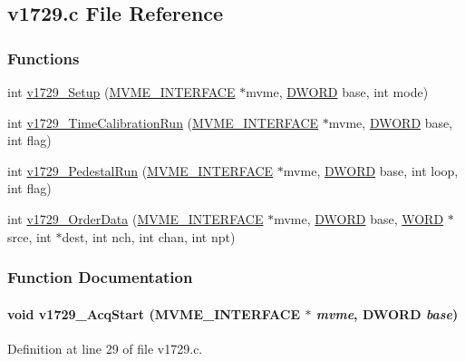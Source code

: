 \subsection{v1729.c File Reference}
\label{v1729_8c}
\subsubsection*{Functions}
\begin{DoxyCompactItemize}
\item 
int \hyperlink{v1729_8c_a16a8a323c157ed043a86ac69a6ada37d}{v1729\_\-Setup} (\hyperlink{structMVME__INTERFACE}{MVME\_\-INTERFACE} $\ast$mvme, \hyperlink{vt2_8h_a798af1e30bc65f319c1a246cecf59e39}{DWORD} base, int mode)
\item 
int \hyperlink{v1729_8c_a6a5b223f30c983b7f4dcac408d3f8b9f}{v1729\_\-TimeCalibrationRun} (\hyperlink{structMVME__INTERFACE}{MVME\_\-INTERFACE} $\ast$mvme, \hyperlink{vt2_8h_a798af1e30bc65f319c1a246cecf59e39}{DWORD} base, int flag)
\item 
int \hyperlink{v1729_8c_a135c3c66398c94b6bee6cccad799cfec}{v1729\_\-PedestalRun} (\hyperlink{structMVME__INTERFACE}{MVME\_\-INTERFACE} $\ast$mvme, \hyperlink{vt2_8h_a798af1e30bc65f319c1a246cecf59e39}{DWORD} base, int loop, int flag)
\item 
int \hyperlink{v1729_8c_a16527915223d5ba500133a7773990d57}{v1729\_\-OrderData} (\hyperlink{structMVME__INTERFACE}{MVME\_\-INTERFACE} $\ast$mvme, \hyperlink{vt2_8h_a798af1e30bc65f319c1a246cecf59e39}{DWORD} base, \hyperlink{vt2_8h_a2b0e863dadf920709ec53d9088ee7c91}{WORD} $\ast$srce, int $\ast$dest, int nch, int chan, int npt)
\end{DoxyCompactItemize}


\subsubsection{Function Documentation}
\paragraph[{v1729\_\-AcqStart}]{\setlength{\rightskip}{0pt plus 5cm}void v1729\_\-AcqStart ({\bf MVME\_\-INTERFACE} $\ast$ {\em mvme}, \/  {\bf DWORD} {\em base})}\hfill\label{v1729_8c_ada0344e2f7a00d26cc500f480fb47e4c}


Definition at line 29 of file v1729.c.

